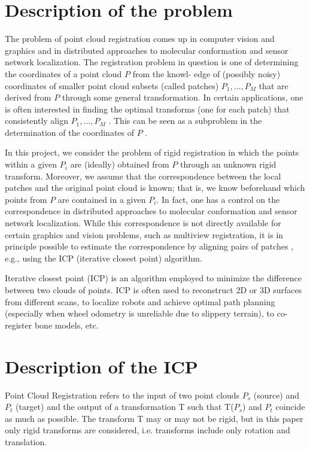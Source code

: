 \documentclass{article} %
\begin{document}
\section{Description of the problem}
The problem of point cloud registration comes up in computer vision \cite{sharp2002multiview} and graphics and in distributed approaches to molecular conformation  and sensor network localization. The registration problem in question is one of determining the coordinates of a point cloud $P$ from the knowl- edge of (possibly noisy) coordinates of smaller point cloud subsets (called patches) $P_1 , . . . , P_M$ that are derived from $P$ through some general transformation\cite{williams2000simultaneous}. In certain applications,\cite{mitra2004registration} one is often interested in finding the optimal transforms (one for each patch) that consistently align $P_1, . . . , P_M$ . This can be seen as a subproblem in the determination of the coordinates of $P$ \cite{cucuringu2012sensor}.

In this project, we consider the problem of rigid registration in which the points within a given $P_i$ are (ideally) obtained from $P$ through an unknown rigid transform. Moreover, we assume that the correspondence between the local patches and the original point cloud is known; that is, we know beforehand which points from $P$ are contained in a given $P_i$. In fact, one has a control on the correspondence in distributed approaches to molecular conformation \cite{cucuringu2012eigenvector} and sensor network localization. While this correspondence is not directly available for certain graphics and vision problems, such as multiview registration\cite{pottmann2006geometry}, it is in principle possible to estimate the correspondence by aligning pairs of patches \cite{huang2013consistent}, e.g., using the ICP (iterative closest point) algorithm.

Iterative closest point (ICP) \cite{besl1992method} is an algorithm employed to minimize the difference between two clouds of points. ICP is often used to reconstruct 2D or 3D surfaces from different scans, to localize robots and achieve optimal path planning (especially when wheel odometry is unreliable due to slippery terrain), to co-register bone models, etc.
\section{Description of the ICP}
Point Cloud Registration refers to the input of two point clouds $P_s$ (source) and $P_t$ (target) and the output of a transformation T such that T($P_s$) and $P_t$ coincide as much as possible. The transform T may or may not be rigid, but in this paper only rigid transforms are considered, i.e. transforms include only rotation and translation.
\end{document}
